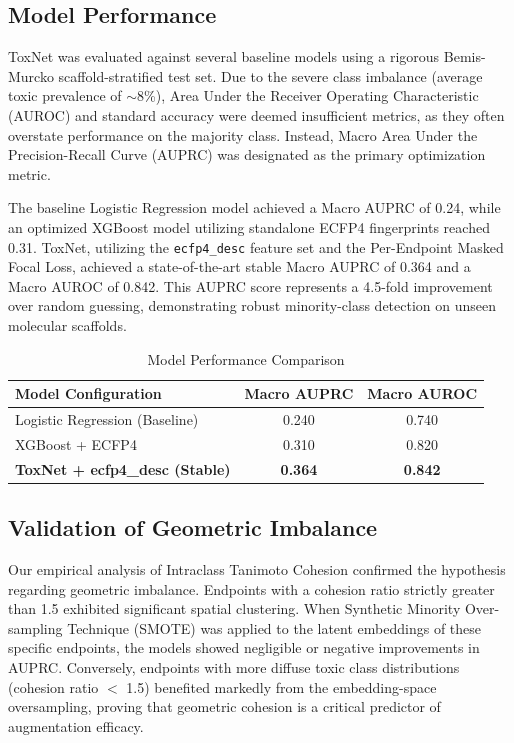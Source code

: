 \documentclass[lettersize,journal]{IEEEtran}
\begin{document}
\subsection{Model Performance}
ToxNet was evaluated against several baseline models using a rigorous Bemis-Murcko scaffold-stratified test set. Due to the severe class imbalance (average toxic prevalence of $\sim$8\%), Area Under the Receiver Operating Characteristic (AUROC) and standard accuracy were deemed insufficient metrics, as they often overstate performance on the majority class. Instead, Macro Area Under the Precision-Recall Curve (AUPRC) was designated as the primary optimization metric. 

The baseline Logistic Regression model achieved a Macro AUPRC of 0.24, while an optimized XGBoost model utilizing standalone ECFP4 fingerprints reached 0.31. ToxNet, utilizing the \texttt{ecfp4\_desc} feature set and the Per-Endpoint Masked Focal Loss, achieved a state-of-the-art stable Macro AUPRC of 0.364 and a Macro AUROC of 0.842. This AUPRC score represents a 4.5-fold improvement over random guessing, demonstrating robust minority-class detection on unseen molecular scaffolds.

\begin{table}[!t]
\caption{Model Performance Comparison\label{tab:metrics}}
\centering
\begin{tabular}{|l||c|c|}
\hline
\textbf{Model Configuration} & \textbf{Macro AUPRC} & \textbf{Macro AUROC} \\
\hline
Logistic Regression (Baseline) & 0.240 & 0.740 \\
\hline
XGBoost + ECFP4 & 0.310 & 0.820 \\
\hline
\textbf{ToxNet + ecfp4\_desc (Stable)} & \textbf{0.364} & \textbf{0.842} \\
\hline
\end{tabular}
\end{table}

\subsection{Validation of Geometric Imbalance}
Our empirical analysis of Intraclass Tanimoto Cohesion confirmed the hypothesis regarding geometric imbalance. Endpoints with a cohesion ratio strictly greater than 1.5 exhibited significant spatial clustering. When Synthetic Minority Over-sampling Technique (SMOTE) was applied to the latent embeddings of these specific endpoints, the models showed negligible or negative improvements in AUPRC. Conversely, endpoints with more diffuse toxic class distributions (cohesion ratio $<$ 1.5) benefited markedly from the embedding-space oversampling, proving that geometric cohesion is a critical predictor of augmentation efficacy.
\end{document}
